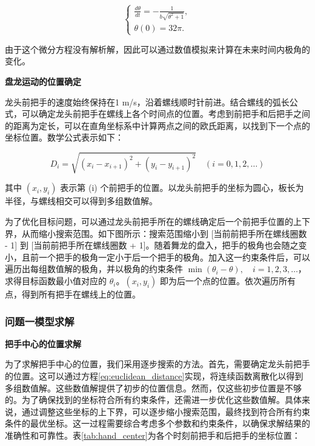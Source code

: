 \documentclass[withoutpreface, bwprint]{cumcmthesis} %
\begin{document}
\begin{equation}
    \begin{cases}
        \frac{d\theta}{dt} = -\frac{1}{b\sqrt{\theta^2 + 1}}, \\
        \theta(0) = 32\pi.
    \end{cases}
\end{equation}

由于这个微分方程没有解析解，因此可以通过数值模拟来计算在未来时间内极角的变化。

\textbf{盘龙运动的位置确定}

龙头前把手的速度始终保持在1 m/s，沿着螺线顺时针前进。结合螺线的弧长公式，可以确定龙头前把手在螺线上各个时间点的位置。考虑到前把手和后把手之间的距离为定长，可以在直角坐标系中计算两点之间的欧氏距离，以找到下一个点的坐标位置。数学公式表示如下：

\begin{equation} \label{eq:euclidean_distance}
    D_i = \sqrt{(x_i - x_{i+1})^2 + (y_i - y_{i+1})^2} \quad (i = 0, 1, 2, \dots)
\end{equation}

其中 $(x_i, y_i)$ 表示第 (i) 个前把手的位置。以龙头前把手的坐标为圆心，板长为半径，与螺线相交可以得到多组数值解。

为了优化目标问题，可以通过龙头前把手所在的螺线确定后一个前把手位置的上下界，从而缩小搜索范围。如下图所示：搜索范围缩小到 [当前前把手所在螺线圈数 - 1] 到 [当前前把手所在螺线圈数 + 1]。随着舞龙的盘入，把手的极角也会随之变小，且前一个把手的极角一定小于后一个把手的极角。加入这一约束条件后，可以遍历出每组数值解的极角，并以极角的约束条件 $\min(\theta_{i} - \theta), \quad i = 1, 2, 3, \dots$，求得目标函数最小值对应的 $\theta_{i}$。$(x_i, y_i)$ 即为后一个点的位置。依次遍历所有点，得到所有把手在螺线上的位置。

\subsubsection{问题一模型求解}

\textbf{把手中心的位置求解}

为了求解把手中心的位置，我们采用逐步搜索的方法。首先，需要确定龙头前把手的位置。这可以通过方程\ref{eq:euclidean_distance}实现，将连续函数离散化以得到多组数值解。这些数值解提供了初步的位置信息。然而，仅这些初步位置是不够的。为了确保找到的坐标符合所有约束条件，还需进一步优化这些数值解。具体来说，通过调整这些坐标的上下界，可以逐步缩小搜索范围，最终找到符合所有约束条件的最优坐标。这一过程需要综合考虑多个参数和约束条件，以确保求解结果的准确性和可靠性。表\ref{tab:hand_center}为各个时刻前把手和后把手的坐标位置：
\end{document}
